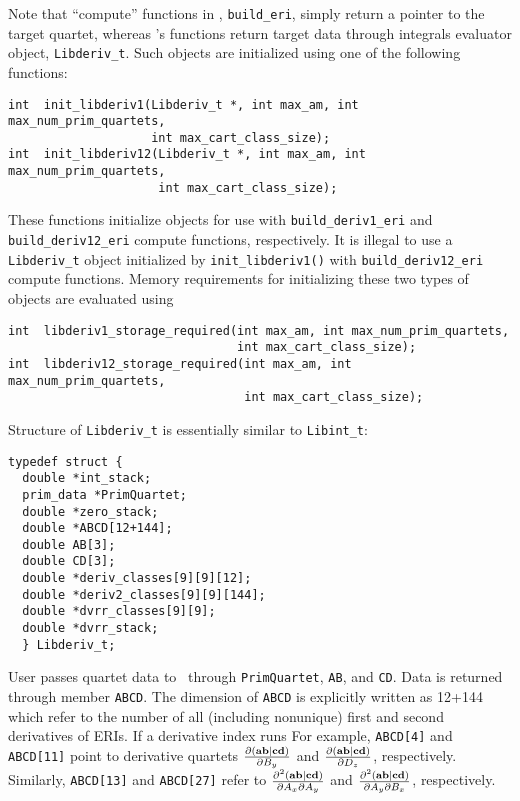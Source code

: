 \documentclass[12pt]{article}
\begin{document}
Note that ``compute'' functions in \libint, {\tt build\_eri}, simply return a pointer
to the target quartet, whereas \libderiv 's functions return target data through integrals
evaluator object, {\tt Libderiv\_t}. Such objects are initialized using one of the following functions:
\begin{verbatim}
int  init_libderiv1(Libderiv_t *, int max_am, int max_num_prim_quartets,
                    int max_cart_class_size);
int  init_libderiv12(Libderiv_t *, int max_am, int max_num_prim_quartets,
                     int max_cart_class_size);
\end{verbatim}
These functions initialize objects for use with {\tt build\_deriv1\_eri} and
{\tt build\_deriv12\_eri} compute functions, respectively. It is illegal to use
a {\tt Libderiv\_t} object initialized by {\tt init\_libderiv1()} with
{\tt build\_deriv12\_eri} compute functions.
Memory requirements for initializing these two types of objects are evaluated using
\begin{verbatim}
int  libderiv1_storage_required(int max_am, int max_num_prim_quartets,
                                int max_cart_class_size);
int  libderiv12_storage_required(int max_am, int max_num_prim_quartets,
                                 int max_cart_class_size);
\end{verbatim}

Structure of {\tt Libderiv\_t} is essentially similar to {\tt Libint\_t}:
\begin{verbatim}
typedef struct {
  double *int_stack;
  prim_data *PrimQuartet;
  double *zero_stack;
  double *ABCD[12+144];
  double AB[3];
  double CD[3];
  double *deriv_classes[9][9][12];
  double *deriv2_classes[9][9][144];
  double *dvrr_classes[9][9];
  double *dvrr_stack;
  } Libderiv_t;
\end{verbatim}
User passes quartet data to \libderiv\ through {\tt PrimQuartet}, {\tt AB},
and {\tt CD}. Data is returned through member {\tt ABCD}. The dimension of {\tt ABCD}
is explicitly written as 12+144 which refer to the number of
all (including nonunique) first and second derivatives of ERIs. If a derivative index runs 
For example, {\tt ABCD[4]} and {\tt ABCD[11]} point
to derivative quartets $\frac{\partial ({\bf ab}|{\bf cd})}{\partial B_y}$ and $\frac{\partial ({\bf ab}|{\bf cd})}{\partial D_z}$, respectively.
Similarly, {\tt ABCD[13]} and {\tt ABCD[27]} refer to $\frac{\partial^2 ({\bf ab}|{\bf cd})}{\partial A_x \partial A_y}$
and $\frac{\partial^2 ({\bf ab}|{\bf cd})}{\partial A_y \partial B_x}$, respectively.
\end{document}
